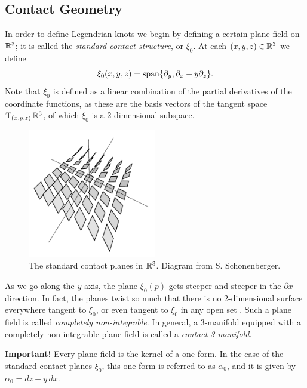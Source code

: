 \subsection{Contact Geometry}

In order to define Legendrian knots we begin by defining a certain plane field on $\mathbb{R}^3$; it is called the \emph{standard contact structure}, or $\xi_0$. At each $(x, y, z) \in \mathbb{R}^3$ we define
\[
    \xi_0(x, y, z) = \operatorname{span} \{\partial_y, \partial_x + y\partial_z\}.
\]
Note that $\xi_0$ is defined as a linear combination of the partial derivatives of the coordinate functions, as these are the basis vectors of the tangent space $\operatorname{T}_{(x, y, z)} \mathbb{R}^3$, of which $\xi_0$ is a 2-dimensional subspace.

\begin{figure}[ht]
    \centering
    \includegraphics[width=0.5\textwidth]{images/contact-planes.pdf}
    \caption{The standard contact planes in $\mathbb{R}^3$. Diagram from S. Schonenberger.}%
    \label{fig:contact-planes}
\end{figure}

As we go along the $y$-axis, the plane $\xi_0(p)$  gets steeper and steeper in the $\partial x$ direction. In fact, the planes twist so much that there is no 2-dimensional surface everywhere tangent to $\xi_0$, or even tangent to $\xi_0$ in any open set \cite{boothby}.
Such a plane field is called \emph{completely non-integrable}.
In general, a 3-manifold equipped with a completely non-integrable plane field is called a \emph{contact 3-manifold}.

\textbf{Important!} Every plane field is the kernel of a one-form. In the case of the standard contact planes $\xi_0$, this one form is referred to as $\alpha_0$, and it is given by $\alpha_0 = dz - y \, dx$.

